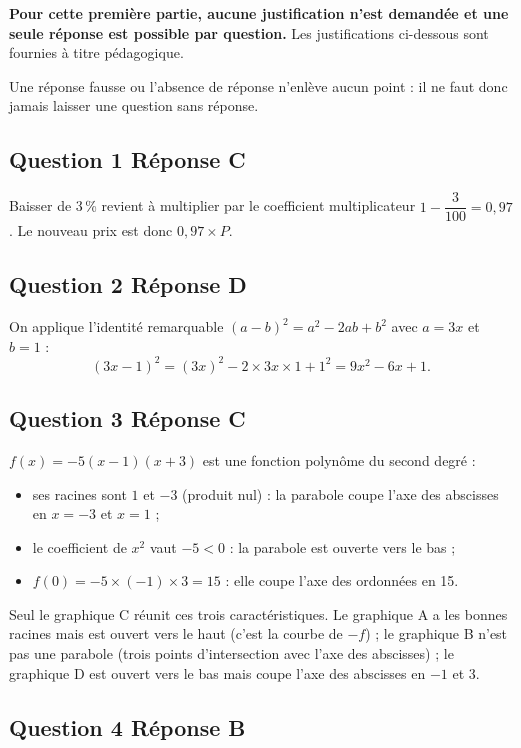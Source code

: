 \textbf{Pour cette première partie, aucune justification n'est demandée et une seule réponse est possible par question.} Les justifications ci-dessous sont fournies à titre pédagogique.

Une réponse fausse ou l'absence de réponse n'enlève aucun point : il ne faut donc jamais laisser une question sans réponse.

\subsection*{Question 1 \quad Réponse C}

Baisser de 3\,\% revient à multiplier par le coefficient multiplicateur
$1 - \dfrac{3}{100} = 0,97$. Le nouveau prix est donc $0,97 \times P$.



\subsection*{Question 2 \quad Réponse D}

On applique l'identité remarquable $(a-b)^2 = a^2 - 2ab + b^2$ avec $a = 3x$ et $b = 1$ :
\[(3x-1)^2 = (3x)^2 - 2\times 3x \times 1 + 1^2 = 9x^2 - 6x + 1.\]

\subsection*{Question 3 \quad Réponse C}

$f(x) = -5(x-1)(x+3)$ est une fonction polynôme du second degré :
\begin{itemize}
	\item ses racines sont $1$ et $-3$ (produit nul) : la parabole coupe l'axe des abscisses
	en $x = -3$ et $x = 1$ ;
	\item le coefficient de $x^2$ vaut $-5 < 0$ : la parabole est ouverte vers le bas ;
	\item $f(0) = -5 \times (-1) \times 3 = 15$ : elle coupe l'axe des ordonnées en 15.
\end{itemize}
Seul le graphique C réunit ces trois caractéristiques. Le graphique A a les bonnes racines
mais est ouvert vers le haut (c'est la courbe de $-f$) ; le graphique B n'est pas une
parabole (trois points d'intersection avec l'axe des abscisses) ; le graphique D est
ouvert vers le bas mais coupe l'axe des abscisses en $-1$ et $3$.

\subsection*{Question 4 \quad Réponse B}

